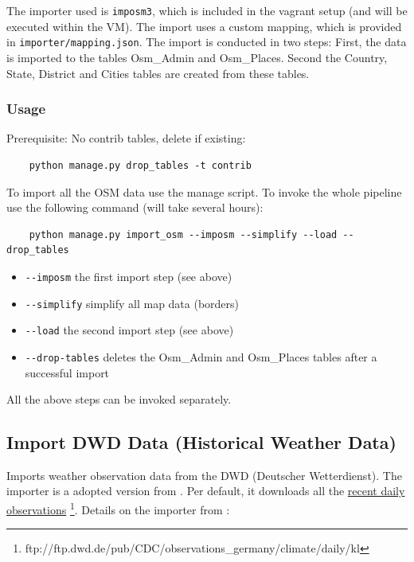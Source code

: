 \documentclass[paper=a4, fontsize=11pt]{article} %
\numberwithin{equation}{section} %
\numberwithin{figure}{section} %
\numberwithin{table}{section} %
\begin{document}
The importer used is \texttt{imposm3}, which is included in the vagrant setup (and will be executed within the VM). The import uses a custom mapping, which is provided in \texttt{importer/mapping.json}. The import is conducted in two steps: First, the data is imported to the tables Osm\_Admin and Osm\_Places. Second the Country, State, District and Cities tables are created from these tables.

\subsubsection*{Usage}\label{usage}

Prerequisite: No contrib tables, delete if existing:
\begin{lstlisting}
	python manage.py drop_tables -t contrib
\end{lstlisting}

To import all the OSM data use the manage script. To invoke the whole pipeline use the following command (will take several hours):

\begin{lstlisting}
	python manage.py import_osm --imposm --simplify --load --drop_tables
\end{lstlisting}


\begin{itemize}
\itemsep1pt\parskip0pt
\item
  \texttt{-\/-imposm} the first import step (see above)
\item
  \texttt{-\/-simplify} simplify all map data (borders)
\item
  \texttt{-\/-load} the second import step (see above)
\item
  \texttt{-\/-drop-tables} deletes the Osm\_Admin and Osm\_Places tables
  after a successful import
\end{itemize}

All the above steps can be invoked separately.

\subsection{Import DWD Data (Historical Weather Data)}\label{import-dwd-data}

Imports weather observation data from the DWD (Deutscher Wetterdienst).
The importer is a adopted version from \cite{website:cholin} . Per default, it downloads all the \href{ftp://ftp.dwd.de/pub/CDC/observations_germany/climate/daily/kl}{recent daily
observations} \footnote{ftp://ftp.dwd.de/pub/CDC/observations\_germany/climate/daily/kl}. Details on the importer from \cite{website:cholin}:
\end{document}
